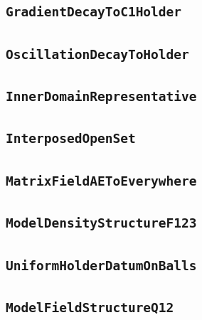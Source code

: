 \documentclass[11pt]{amsart}
\theoremstyle{definition}
\begin{document}
\subsection{\texorpdfstring{\texttt{GradientDecayToC1Holder}}{GradientDecayToC1Holder}}\label{node:GradientDecayToC1Holder}


\subsection{\texorpdfstring{\texttt{OscillationDecayToHolder}}{OscillationDecayToHolder}}\label{node:OscillationDecayToHolder}


\subsection{\texorpdfstring{\texttt{InnerDomainRepresentative}}{InnerDomainRepresentative}}\label{node:InnerDomainRepresentative}


\subsection{\texorpdfstring{\texttt{InterposedOpenSet}}{InterposedOpenSet}}\label{node:InterposedOpenSet}


\subsection{\texorpdfstring{\texttt{MatrixFieldAEToEverywhere}}{MatrixFieldAEToEverywhere}}\label{node:MatrixFieldAEToEverywhere}


\subsection{\texorpdfstring{\texttt{ModelDensityStructureF123}}{ModelDensityStructureF123}}\label{node:ModelDensityStructureF123}


\subsection{\texorpdfstring{\texttt{UniformHolderDatumOnBalls}}{UniformHolderDatumOnBalls}}\label{node:UniformHolderDatumOnBalls}


\subsection{\texorpdfstring{\texttt{ModelFieldStructureQ12}}{ModelFieldStructureQ12}}\label{node:ModelFieldStructureQ12}

\end{document}
